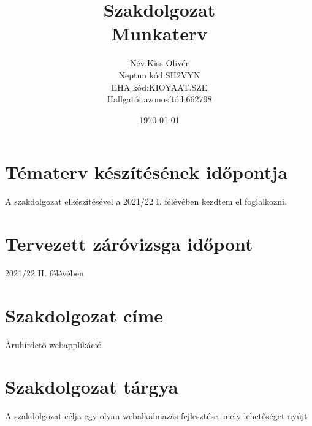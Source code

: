\documentclass[a4paper,12pt]{article}
\title{%
\vspace*{-2.25cm}%
\Large Szakdolgozat \\
\large Munkaterv}
\author{
\normalsize
\begin{tabular}{r l}
    Név: & Kiss Olivér \\
    Neptun kód: & SH2VYN \\
    EHA kód: & KIOYAAT.SZE \\
    Hallgatói azonosító: & h662798
\end{tabular}
}
\date{\normalsize \today}
\begin{document}
\maketitle


\section*{Tématerv készítésének időpontja}

A szakdolgozat elkészítésével a 2021/22 I. félévében kezdtem el foglalkozni.


\section*{Tervezett záróvizsga időpont}

2021/22 II. félévében


\section*{Szakdolgozat címe}

Áruhírdető webapplikáció


\section*{Szakdolgozat tárgya}

A szakdolgozat célja egy olyan webalkalmazás fejlesztése, mely lehetőséget nyújt
\end{document}
